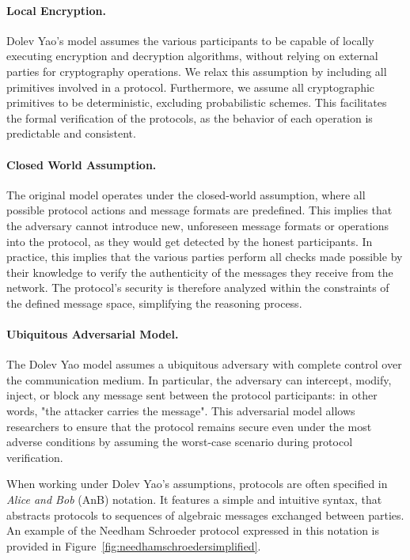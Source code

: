 \paragraph{\textbf{Local Encryption}.} Dolev Yao's model assumes the various participants to be capable of locally executing encryption and decryption algorithms, without relying on external parties for cryptography operations. We relax this assumption by including all primitives involved in a protocol. Furthermore, we assume all cryptographic primitives to be deterministic, excluding probabilistic schemes. This facilitates the formal verification of the protocols, as the behavior of each operation is predictable and consistent.

\paragraph{\textbf{Closed World Assumption}.} The original model operates under the closed-world assumption, where all possible protocol actions and message formats are predefined. This implies that the adversary cannot introduce new, unforeseen message formats or operations into the protocol, as they would get detected by the honest participants. In practice, this implies that the various parties perform all checks made possible by their knowledge to verify the authenticity of the messages they receive from the network. The protocol’s security is therefore analyzed within the constraints of the defined message space, simplifying the reasoning process.

\paragraph{\textbf{Ubiquitous Adversarial Model}.} The Dolev Yao model assumes a ubiquitous adversary with complete control over the communication medium. In particular, the adversary can intercept, modify, inject, or block any message sent between the protocol participants: in other words, "the attacker carries the message". This adversarial model allows researchers to ensure that the protocol remains secure even under the most adverse conditions by assuming the worst-case scenario during protocol verification.

\vspace{10pt}

When working under Dolev Yao's assumptions, protocols are often specified in \textit{Alice and Bob} (AnB) notation. It features a simple and intuitive syntax, that abstracts protocols to sequences of algebraic messages exchanged between parties. An example of the Needham Schroeder protocol expressed in this notation is provided in Figure~\ref{fig:needhamschroedersimplified}.

